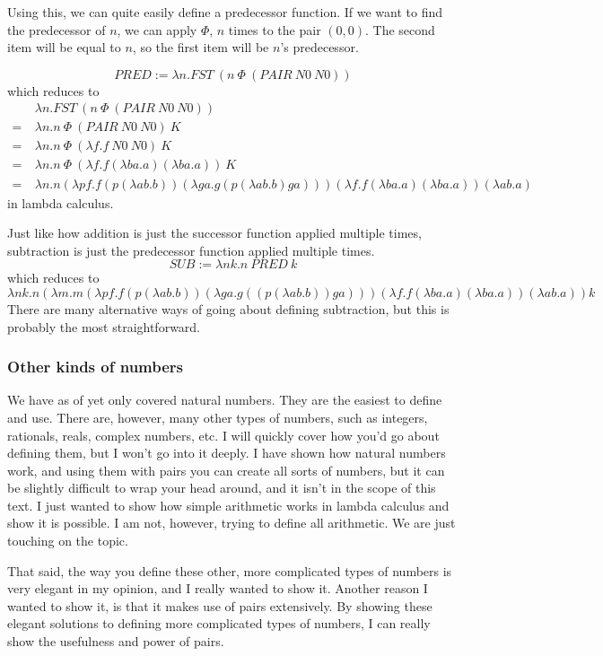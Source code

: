 \documentclass[11pt]{article}
\begin{document}
Using this, we can quite easily define a predecessor function. If we want to
find the predecessor of \(n\), we can apply \(\Phi\), \(n\) times to the pair
\((0,0)\). The second item will be equal to \(n\), so the first item will be
\(n\)'s predecessor.

\[PRED:=\lambda n.FST\ (n\ \Phi\ (PAIR\ N0\ N0))\]
which reduces to
\begin{align*}
	&\lambda n.FST\ (n\ \Phi\ (PAIR\ N0\ N0))\\
	=\ &\lambda n.n\ \Phi\ (PAIR\ N0\ N0)\ K\\
	=\ &\lambda n.n\ \Phi\ (\lambda f.f\ N0\ N0)\ K\\
	=\ &\lambda n.n\ \Phi\ (\lambda f.f(\lambda ba.a)(\lambda ba.a))\ K\\
	=\ &\lambda n.n
		(\lambda pf.f(p(\lambda ab.b))(\lambda ga.g(p(\lambda ab.b)ga)))
		(\lambda f.f(\lambda ba.a)(\lambda ba.a))
		(\lambda ab.a)
\end{align*}
in lambda calculus.

Just like how addition is just the successor function applied multiple times,
subtraction is just the predecessor function applied multiple times.
\[SUB:=\lambda nk.n\ PRED\ k\]
which reduces to
\[
	\lambda nk.n
		(\lambda m.m
			(\lambda pf.f(p(\lambda ab.b))(\lambda ga.g((p(\lambda ab.b))ga)))
			(\lambda f.f(\lambda ba.a)(\lambda ba.a))
			(\lambda ab.a))k
\]
There are many alternative ways of going about defining subtraction, but this
is probably the most straightforward.

\subsubsection{Other kinds of numbers}

We have as of yet only covered natural numbers. They are the easiest to define
and use. There are, however, many other types of numbers, such as integers,
rationals, reals, complex numbers, etc. I will quickly cover how you'd go about
defining them, but I won't go into it deeply. I have shown how natural numbers
work, and using them with pairs you can create all sorts of numbers, but it can
be slightly difficult to wrap your head around, and it isn't in the scope of
this text. I just wanted to show how simple arithmetic works in lambda calculus
and show it is possible. I am not, however, trying to define all arithmetic. We
are just touching on the topic.

That said, the way you define these other, more complicated types of numbers is
very elegant in my opinion, and I really wanted to show it. Another reason I
wanted to show it, is that it makes use of pairs extensively. By showing these
elegant solutions to defining more complicated types of numbers, I can really
show the usefulness and power of pairs.
\end{document}
